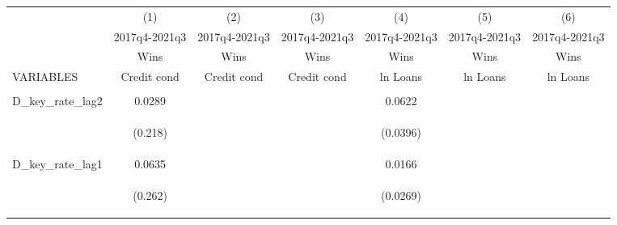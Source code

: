 \documentclass[]{article}
\begin{document}
\begin{center}
\begin{tabular}{lcccccc} \hline
 & (1) & (2) & (3) & (4) & (5) & (6) \\
 & 2017q4-2021q3 & 2017q4-2021q3 & 2017q4-2021q3 & 2017q4-2021q3 & 2017q4-2021q3 & 2017q4-2021q3 \\
 & Wins & Wins & Wins & Wins & Wins & Wins \\
VARIABLES & Credit cond & Credit cond & Credit cond & ln Loans & ln Loans & ln Loans \\ \hline
\vspace{4pt} & \begin{footnotesize}\end{footnotesize} & \begin{footnotesize}\end{footnotesize} & \begin{footnotesize}\end{footnotesize} & \begin{footnotesize}\end{footnotesize} & \begin{footnotesize}\end{footnotesize} & \begin{footnotesize}\end{footnotesize} \\
D\_key\_rate\_lag2 & 0.0289 &  &  & 0.0622 &  &  \\
\vspace{4pt} & \begin{footnotesize}(0.218)\end{footnotesize} & \begin{footnotesize}\end{footnotesize} & \begin{footnotesize}\end{footnotesize} & \begin{footnotesize}(0.0396)\end{footnotesize} & \begin{footnotesize}\end{footnotesize} & \begin{footnotesize}\end{footnotesize} \\
D\_key\_rate\_lag1 & 0.0635 &  &  & 0.0166 &  &  \\
\vspace{4pt} & \begin{footnotesize}(0.262)\end{footnotesize} & \begin{footnotesize}\end{footnotesize} & \begin{footnotesize}\end{footnotesize} & \begin{footnotesize}(0.0269)\end{footnotesize} & \begin{footnotesize}\end{footnotesize} & \begin{footnotesize}\end{footnotesize} \\

\end{tabular}
\end{center}
\end{document}
